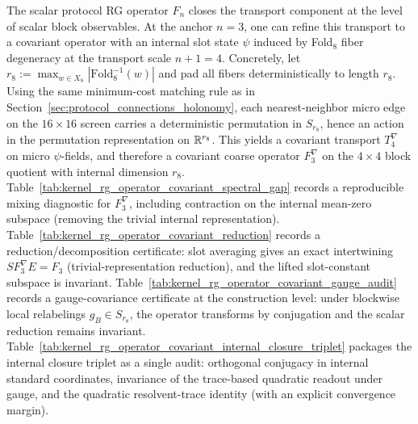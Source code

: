 \begin{remark}\label{rem:rg_covariant_operator_anchor}
\AuditTag The scalar protocol RG operator $F_n$ closes the transport component at the level of scalar block observables.
At the anchor $n=3$, one can refine this transport to a covariant operator with an internal slot state $\psi$ induced by Fold$_8$ fiber degeneracy at the transport scale $n+1=4$.
Concretely, let $r_8:=\max_{w\in X_8}|\mathrm{Fold}_8^{-1}(w)|$ and pad all fibers deterministically to length $r_8$.
Using the same minimum-cost matching rule as in Section~\ref{sec:protocol_connections_holonomy}, each nearest-neighbor micro edge on the $16\times16$ screen carries a deterministic permutation in $S_{r_8}$, hence an action in the permutation representation on $\mathbb{R}^{r_8}$.
This yields a covariant transport $T_{4}^\nabla$ on micro $\psi$-fields, and therefore a covariant coarse operator $F_3^\nabla$ on the $4\times4$ block quotient with internal dimension $r_8$.
Table~\ref{tab:kernel_rg_operator_covariant_spectral_gap} records a reproducible mixing diagnostic for $F_3^\nabla$, including contraction on the internal mean-zero subspace (removing the trivial internal representation).
\AuditTag Table~\ref{tab:kernel_rg_operator_covariant_reduction} records a reduction/decomposition certificate: slot averaging gives an exact intertwining $S F_3^\nabla E = F_3$ (trivial-representation reduction), and the lifted slot-constant subspace is invariant.
\AuditTag Table~\ref{tab:kernel_rg_operator_covariant_gauge_audit} records a gauge-covariance certificate at the construction level: under blockwise local relabelings $g_B\in S_{r_8}$, the operator transforms by conjugation and the scalar reduction remains invariant.
\AuditTag Table~\ref{tab:kernel_rg_operator_covariant_internal_closure_triplet} packages the internal closure triplet as a single audit: orthogonal conjugacy in internal standard coordinates, invariance of the trace-based quadratic readout under gauge, and the quadratic resolvent-trace identity (with an explicit convergence margin).
\end{remark}

